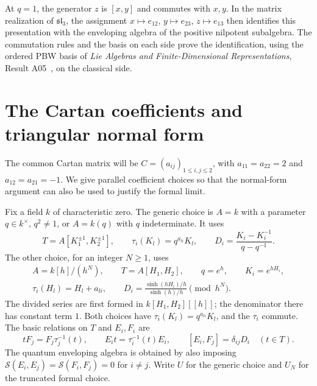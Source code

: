 At \(q=1\), the generator \(z\) is \([x,y]\) and commutes with
\(x,y\). In the matrix realization of \(\mathfrak{sl}_3\), the
assignment \(x\mapsto e_{12}\), \(y\mapsto e_{23}\),
\(z\mapsto e_{13}\) then identifies this presentation
with the enveloping algebra of the positive nilpotent subalgebra.
The commutation rules and the basis on each side prove the
identification, using the ordered PBW basis of
\emph{Lie Algebras and Finite-Dimensional Representations},
Result A05~\cite[PDF pp.~8--9]{mg-lie}, on the classical side.

\section{The Cartan coefficients and triangular normal form}

The common Cartan matrix will be \(C=(a_{ij})_{1\le i,j\le 2}\),
with \(a_{11}=a_{22}=2\) and \(a_{12}=a_{21}=-1\).
We give parallel coefficient choices so that the normal-form
argument can also be used to justify the formal limit.

\begin{definition}
\label{res:UQ02}
Fix a field \(k\) of characteristic zero. The generic choice is
\(A=k\) with a parameter \(q\in k^\times\), \(q^2\ne1\), or
\(A=k(q)\) with \(q\) indeterminate. It uses
\[
 T=A[K_1^{\pm1},K_2^{\pm1}],\qquad
 \tau_i(K_l)=q^{a_{li}}K_l,\qquad
 D_i=\frac{K_i-K_i^{-1}}{q-q^{-1}} .
\]
The other choice, for an integer \(N\ge1\), uses
\[
 \begin{gathered}
 A=k[h]/(h^N),\qquad T=A[H_1,H_2],\qquad
 q=e^h,\qquad K_i=e^{hH_i},\\
 \tau_i(H_l)=H_l+a_{li},\qquad
 D_i=\frac{\sinh(hH_i)/h}{\sinh(h)/h}\pmod {h^N}.
 \end{gathered}
\]
The divided series are first formed in \(k[H_1,H_2][[h]]\);
the denominator there has constant term \(1\).
Both choices have \(\tau_i(K_l)=q^{a_{li}}K_l\), and the
\(\tau_i\) commute. The basic relations on \(T\) and \(E_i,F_i\) are
\[
 t F_j=F_j\tau_j^{-1}(t),\qquad
 E_i t=\tau_i^{-1}(t)E_i,\qquad
 [E_i,F_j]=\delta_{ij}D_i \quad (t\in T).
\]
The quantum enveloping algebra is obtained by also imposing
\(\mathcal S(E_i,E_j)=\mathcal S(F_i,F_j)=0\) for \(i\ne j\).
Write \(U\) for the generic choice and \(U_N\) for the truncated
formal choice.
\end{definition}

